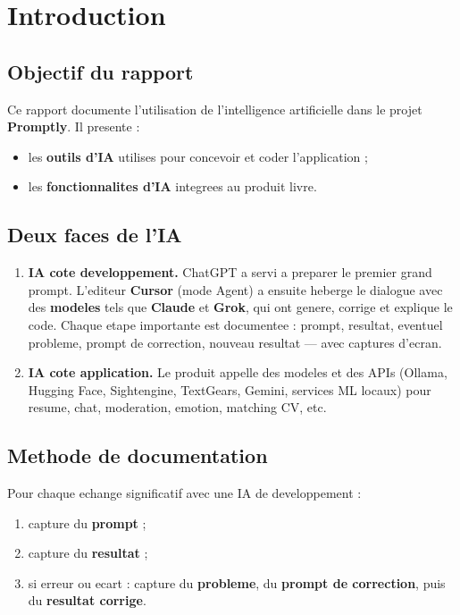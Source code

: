 \chapter{Introduction}
\label{ch:intro}

\section{Objectif du rapport}

Ce rapport documente l'utilisation de l'intelligence artificielle dans le projet
\textbf{Promptly}. Il presente :
\begin{itemize}
  \item les \textbf{outils d'IA} utilises pour concevoir et coder l'application ;
  \item les \textbf{fonctionnalites d'IA} integrees au produit livre.
\end{itemize}

\section{Deux faces de l'IA}

\begin{enumerate}
  \item \textbf{IA cote developpement.} ChatGPT a servi a preparer le premier
        grand prompt. L'editeur \textbf{Cursor} (mode Agent) a ensuite heberge
        le dialogue avec des \textbf{modeles} tels que \textbf{Claude} et
        \textbf{Grok}, qui ont genere, corrige et explique le code. Chaque etape
        importante est documentee : prompt, resultat, eventuel probleme, prompt
        de correction, nouveau resultat --- avec captures d'ecran.
  \item \textbf{IA cote application.} Le produit appelle des modeles et des APIs
        (Ollama, Hugging Face, Sightengine, TextGears, Gemini, services ML locaux)
        pour resume, chat, moderation, emotion, matching CV, etc.
\end{enumerate}

\section{Methode de documentation}

Pour chaque echange significatif avec une IA de developpement :
\begin{enumerate}
  \item capture du \textbf{prompt} ;
  \item capture du \textbf{resultat} ;
  \item si erreur ou ecart : capture du \textbf{probleme}, du \textbf{prompt de
        correction}, puis du \textbf{resultat corrige}.
\end{enumerate}

